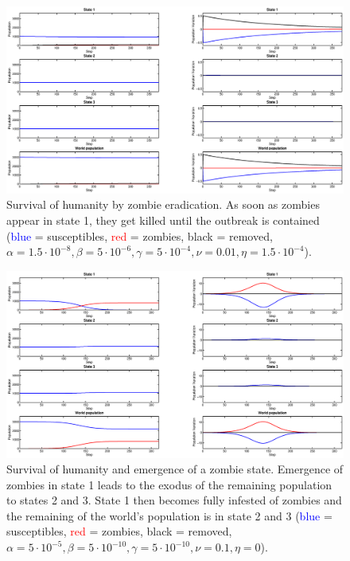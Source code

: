 \documentclass[11pt]{article} %
\begin{document}
\begin{figure}[h!]
\centerline{
\includegraphics[scale=0.35]{Images/example_zkill.eps}}
\caption{Survival of humanity by zombie eradication. As soon as zombies appear in state 1, they get killed until the outbreak is contained  (\textcolor{blue}{blue} = susceptibles, \textcolor{red}{red} = zombies, black = removed, $\alpha=1.5\cdot10^{-8}, \beta=5\cdot10^{-6}, \gamma=5\cdot10^{-4}, \nu=0.01, \eta=1.5\cdot10^{-4}$).
\label{skill} }
\end{figure}

\begin{figure}[h!]
\centerline{
\includegraphics[scale=0.35]{Images/example_exode.eps}}
\caption{Survival of humanity and emergence of a zombie state. Emergence of zombies in state 1 leads to the exodus of the remaining population to states 2 and 3. State 1 then becomes fully infested of zombies and the remaining of the world's population is in state 2 and 3 (\textcolor{blue}{blue} = susceptibles, \textcolor{red}{red} = zombies, black = removed, $\alpha=5\cdot10^{-5},  \beta=5\cdot10^{-10},  \gamma=5\cdot10^{-10},  \nu=0.1,  \eta=0$). \label{exodus} }
\end{figure}
\end{document}
